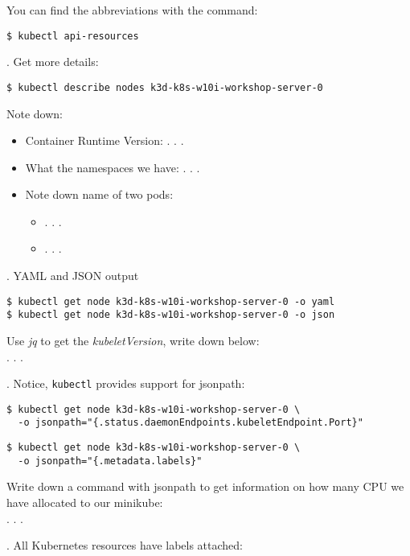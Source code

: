 \documentclass[12pt, letterpaper]{article}
\begin{document}
You can find the abbreviations with the command: 

\begin{verbatim}
$ kubectl api-resources
\end{verbatim}

. Get more details: 

\begin{verbatim}
$ kubectl describe nodes k3d-k8s-w10i-workshop-server-0
\end{verbatim}

Note down:
\begin{itemize}
    \item Container Runtime Version: . . .
    \item  What the namespaces we have: . . .
    \item  Note down name of two pods:\begin{itemize}
        \item . . .
        \item . . .
     \end{itemize}
\end{itemize}

. YAML and JSON output

\begin{verbatim}
$ kubectl get node k3d-k8s-w10i-workshop-server-0 -o yaml
$ kubectl get node k3d-k8s-w10i-workshop-server-0 -o json
\end{verbatim}

Use \textit{jq} to get the \textit{kubeletVersion}, write down below:
\\

   . . .

. Notice, \verb|kubectl| provides support for jsonpath:

\begin{verbatim}
$ kubectl get node k3d-k8s-w10i-workshop-server-0 \
  -o jsonpath="{.status.daemonEndpoints.kubeletEndpoint.Port}"
\end{verbatim}

\begin{verbatim}
$ kubectl get node k3d-k8s-w10i-workshop-server-0 \
  -o jsonpath="{.metadata.labels}"
\end{verbatim}

Write down a command with jsonpath to get information on how many CPU we have allocated to our minikube:
\\

   . . .


. All Kubernetes resources have labels attached:
\end{document}
